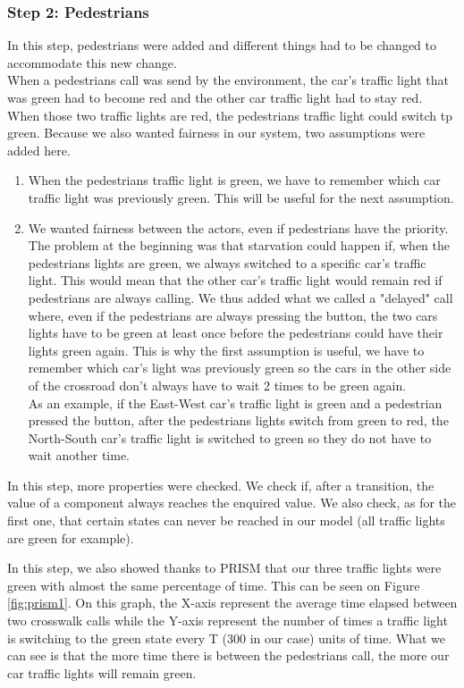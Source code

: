 \subsubsection{Step 2: Pedestrians}
In this step, pedestrians were added and different things had to be changed to accommodate this new change. \\ 

When a pedestrians call was send by the environment, the car's traffic light that was green had to become red and the other car traffic light had to stay red. When those two traffic lights are red, the pedestrians traffic light could switch tp green. Because we also wanted fairness in our system, two assumptions were added here.
\begin{enumerate}
    \item When the pedestrians traffic light is green, we have to remember which car traffic light was previously green. This will be useful for the next assumption.
    \item We wanted fairness between the actors, even if pedestrians have the priority. The problem at the beginning was that starvation could happen if, when the pedestrians lights are green, we always switched to a specific car's traffic light. This would mean that the other car's traffic light would remain red if pedestrians are always calling. We thus added what we called a "delayed" call where, even if the pedestrians are always pressing the button, the two cars lights have to be green at least once before the pedestrians could have their lights green again. This is why the first assumption is useful, we have to remember which car's light was previously green so the cars in the other side of the crossroad don't always have to wait 2 times to be green again. \\
    As an example, if the East-West car's traffic light is green and a pedestrian pressed the button, after the pedestrians lights switch from green to red, the North-South car's traffic light is switched to green so they do not have to wait another time.
\end{enumerate}
In this step, more properties were checked. We check if, after a transition, the value of a component always reaches the enquired value. We also check, as for the first one, that certain states can never be reached in our model (all traffic lights are green for example).

\noindent In this step, we also showed thanks to PRISM that our three traffic lights were green with almost the same percentage of time. This can be seen on Figure \ref{fig:prism1}. On this graph, the X-axis represent the average time elapsed between two crosswalk calls while the Y-axis represent the number of times a traffic light is switching to the green state every T (300 in our case) units of time. What we can see is that the more time there is between the pedestrians call, the more our car traffic lights will remain green.

